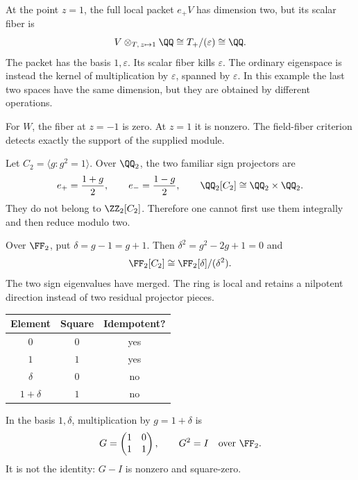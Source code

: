 At the point $z=1$, the full local packet $e_+V$ has dimension two, but its scalar fiber is
\[
V\otimes_{T,\,z\mapsto1}\QQ
\cong T_+/(\varepsilon)\cong\QQ.
\]
The packet has the basis $1,\varepsilon$. Its scalar fiber kills $\varepsilon$. The ordinary eigenspace is instead the kernel of multiplication by $\varepsilon$, spanned by $\varepsilon$. In this example the last two spaces have the same dimension, but they are obtained by different operations.

For $W$, the fiber at $z=-1$ is zero. At $z=1$ it is nonzero. The field-fiber criterion detects exactly the support of the supplied module.


Let $C_2=\langle g:g^2=1\rangle$. Over $\QQ_2$, the two familiar sign projectors are
\[
e_+=\frac{1+g}{2},\qquad e_-=\frac{1-g}{2},
\qquad \QQ_2[C_2]\cong\QQ_2\times\QQ_2.
\]
They do not belong to $\ZZ_2[C_2]$. Therefore one cannot first use them integrally and then reduce modulo two.

Over $\FF_2$, put $\delta=g-1=g+1$. Then $\delta^2=g^2-2g+1=0$ and
\[
\FF_2[C_2]\cong\FF_2[\delta]/(\delta^2).
\]
The two sign eigenvalues have merged. The ring is local and retains a nilpotent direction instead of two residual projector pieces.

\begin{minipage}[c]{.48\linewidth}
\centering
\begin{tabular}{@{}ccc@{}}\toprule
Element & Square & Idempotent?\\\midrule
$0$ & $0$ & yes\\
$1$ & $1$ & yes\\
$\delta$ & $0$ & no\\
$1+\delta$ & $1$ & no\\\bottomrule
\end{tabular}
\end{minipage}\hfill
\begin{minipage}[c]{.47\linewidth}
In the basis $1,\delta$, multiplication by $g=1+\delta$ is
\[
G=\begin{pmatrix}1&0\\1&1\end{pmatrix},\qquad
G^2=I\quad\text{over }\FF_2.
\]
It is not the identity: $G-I$ is nonzero and square-zero.
\end{minipage}

